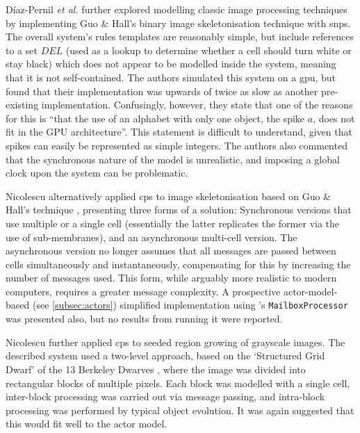 Díaz-Pernil \textit{et al.} \cite{Diaz-Pernil2013a} further explored modelling classic image processing techniques by implementing Guo \& Hall's binary image skeletonisation technique \cite{Guo1989} with \gls{snps}.  The overall system's rules templates are reasonably simple, but include references to a set \(DEL\) (used as a lookup to determine whether a cell should turn white or stay black) which does not appear to be modelled inside the system, meaning that it is not self-contained.  The authors simulated this system on a \gls{gpu}, but found that their implementation was upwards of twice as slow as another pre-existing implementation.  Confusingly, however, they state that one of the reasons for this is ``that the use of an alphabet with only one object, the spike \(a\), does not fit in the GPU architecture''.  This statement is difficult to understand, given that spikes can easily be represented as simple integers.  The authors also commented that the synchronous nature of the model is unrealistic, and imposing a global clock upon the system can be problematic.

Nicolescu \cite{Nicolescu2014} alternatively applied \gls{cps} to image skeletonisation based on Guo \& Hall's technique \cite{Guo1989}, presenting three forms of a solution: Synchronous versions that use multiple or a single cell (essentially the latter replicates the former via the use of sub-membranes), and an asynchronous multi-cell version.  The asynchronous version no longer assumes that all messages are passed between cells simultaneously and instantaneously, compensating for this by increasing the number of messages used.  This form, while arguably more realistic to modern computers, requires a greater message complexity. A prospective \gls{actor}-model-based (see \autoref{subsec:actors}) simplified implementation using \fsharp{}'s \texttt{MailboxProcessor} \cite[ch.~11]{Syme2015a} was presented also, but no results from running it were reported.

Nicolescu \cite{Nicolescu2015a} further applied \gls{cps} to seeded region growing of grayscale images.  The described system used a two-level approach, based on the `Structured Grid Dwarf' of the 13 Berkeley Dwarves \cite{Asanovic2006}, where the image was divided into rectangular blocks of multiple pixels.  Each block was modelled with a single cell, inter-block processing was carried out via message passing, and intra-block processing was performed by typical object evolution.  It was again suggested that this would fit well to the \gls{actor} model.

